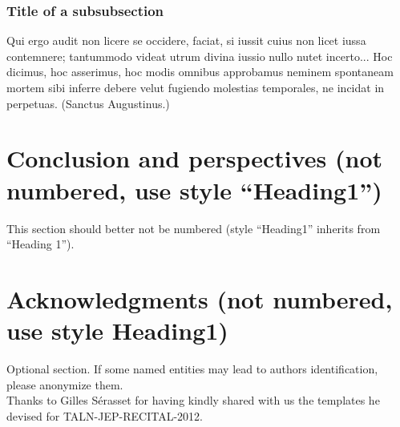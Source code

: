 \documentclass[10pt,a5paper,twoside]{article}
\begin{document}
\subsubsection{Title of a subsubsection}
Qui ergo audit non licere se occidere, faciat, si iussit cuius non licet iussa contemnere; tantummodo videat utrum divina iussio nullo nutet incerto... Hoc dicimus, hoc asserimus, hoc modis omnibus approbamus neminem spontaneam mortem sibi inferre debere velut fugiendo molestias temporales, ne incidat in perpetuas. (Sanctus Augustinus.)

\section*{Conclusion and perspectives (not numbered, use style “Heading1”)} %
This section should better not be numbered (style “Heading1” inherits from “Heading 1”).
\section*{Acknowledgments (not numbered, use style Heading1)}
Optional section. If some named entities may lead to authors identification, please anonymize them.	\\
Thanks to Gilles S\'erasset for having kindly shared with us the templates he devised for TALN-JEP-RECITAL-2012. 

%





\nocite{TALN2007,LaigneletRioult09,LanglaisPatry07,au1972,cks1981,mb2012}

\end{document}
